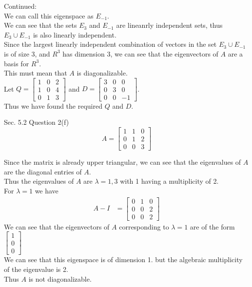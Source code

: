 \documentclass[answers,12pt,addpoints]{exam}
\begin{document}
\begin{questions}
    \begin{solution}
        Continued:\\
        We can call this eigenspace as $E_{-1}$.\\
        We can see that the sets $E_{3}$ and $E_{-1}$ are lineanrly independent sets, thus $E_{3} \cup E_{-1}$ is also linearly independent. \\
        Since the largest linearly independent combination of vectors in the set $E_{3} \cup E_{-1}$ is of size 3, and $R^3$ has dimension 3, we can see that the eigenvectors of $A$ are a basis for $R^3$.\\
        This must mean that $A$ is diagonalizable.\\
        Let $Q = \begin{bmatrix}
            1 & 0 & 2\\
            1 & 0 & 4\\
            0 & 1 & 3
        \end{bmatrix}$ and $D = \begin{bmatrix}
            3 & 0 & 0\\
            0 & 3 & 0\\
            0 & 0 & -1
        \end{bmatrix}$.\\
        Thus we have found the required $Q$ and $D$.
    \end{solution}

    \question[10] Sec. 5.2 Question 2(f)
    $$ A = \begin{bmatrix}
        1 & 1 & 0\\
        0 & 1 & 2\\
        0 & 0 & 3
    \end{bmatrix}$$
    \begin{solution}
        Since the matrix is already upper triangular, we can see that the eigenvalues of $A$ are the diagonal entries of $A$.\\
        Thus the eigenvalues of $A$ are $\lambda = 1, 3$ with 1 having a multiplicity of 2.\\
        For $\lambda = 1$ we have
        \begin{align*}
            A - I &= \begin{bmatrix}
                0 & 1 & 0\\
                0 & 0 & 2\\
                0 & 0 & 2
            \end{bmatrix}
        \end{align*}
        We can see that the eigenvectors of $A$ corresponding to $\lambda = 1$ are of the form $\begin{bmatrix}
            1\\
            0\\
            0
        \end{bmatrix}$\\
        We can see that this eigenspace is of dimension 1. but the algebraic multiplicity of the eigenvalue is 2.\\
        Thus $A$ is not diagonalizable.
    \end{solution}


\end{questions}
\end{document}
